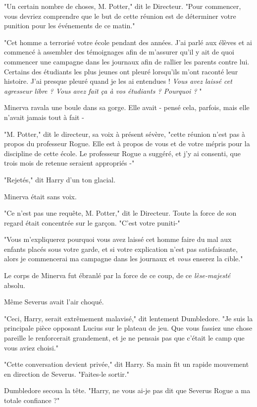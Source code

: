 "Un certain nombre de choses, M. Potter," dit le Directeur. "Pour commencer, vous devriez comprendre que le but de cette réunion est de déterminer votre punition pour les événements de ce matin."

"Cet homme a terrorisé votre école pendant des années. J'ai parlé aux élèves et ai commencé à assembler des témoignages afin de m'assurer qu'il y ait de quoi commencer une campagne dans les journaux afin de rallier les parents contre lui. Certains des étudiants les plus jeunes ont pleuré lorsqu'ils m'ont raconté leur histoire. J'ai presque pleuré quand je les ai entendues ! \emph{Vous avez laissé cet agresseur libre ? Vous avez fait ça à vos étudiants ? Pourquoi ?} "

Minerva ravala une boule dans sa gorge. Elle avait - pensé cela, parfois, mais elle n'avait jamais tout à fait -

"M. Potter," dit le directeur, sa voix à présent sévère, "cette réunion n'est pas à propos du professeur Rogue. Elle est à propos de vous et de votre mépris pour la discipline de cette école. Le professeur Rogue a suggéré, et j'y ai consenti, que trois mois de retenue seraient appropriés -"

"Rejetés," dit Harry d'un ton glacial.

Minerva était sans voix.

"Ce n'est pas une requête, M. Potter," dit le Directeur. Toute la force de son regard était concentrée sur le garçon. "C'est votre puniti-"

"Vous m'expliquerez pourquoi vous avez laissé cet homme faire du mal aux enfants placés sous votre garde, et si votre explication n'est pas satisfaisante, alors je commencerai ma campagne dans les journaux et \emph{vous } enserez la cible."

Le corps de Minerva fut ébranlé par la force de ce coup, de ce \emph{lèse-majesté}  absolu.

Même Severus avait l'air choqué.

"Ceci, Harry, serait extrêmement malavisé," dit lentement Dumbledore. "Je suis la principale pièce opposant Lucius sur le plateau de jeu. Que vous fassiez une chose pareille le renforcerait grandement, et je ne pensais pas que c'était le camp que vous aviez choisi."

"Cette conversation devient privée," dit Harry. Sa main fit un rapide mouvement en direction de Severus. "Faites-le sortir."

Dumbledore secoua la tête. "Harry, ne vous ai-je pas dit que Severus Rogue a ma totale confiance ?"

